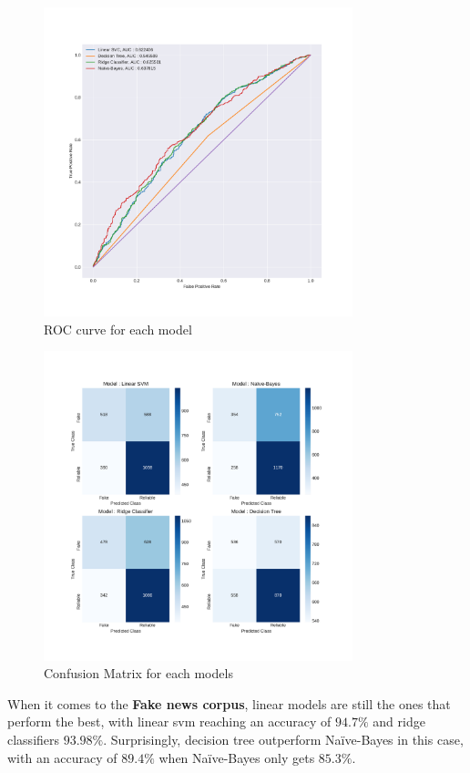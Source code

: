 \begin{figure}
 \centering
 \includegraphics[width=0.8\textwidth]{images/chapitre3/roc1}
 \caption{ROC curve for each model}
 \label{fig:chap3:roc1}
\end{figure}
\begin{figure}
 \centering
 \includegraphics[width=0.8\textwidth]{images/chapitre3/test_liar_confMat}
 \caption{Confusion Matrix for each models}
 \label{fig:chap3:confMat1}
\end{figure}
When it comes to the \textbf{Fake news corpus}, linear models are still the ones that perform the best, with linear svm reaching an accuracy of $94.7\%$ and ridge classifiers $93.98\%$. Surprisingly, decision tree outperform Na\"{i}ve-Bayes in this case, with an accuracy of $89.4\%$ when Na\"{i}ve-Bayes only gets $85.3\%$.\\

